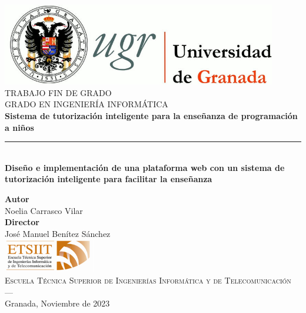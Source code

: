 \begin{titlepage}
 
 
\newlength{\centeroffset}
\setlength{\centeroffset}{-0.5\oddsidemargin}
\addtolength{\centeroffset}{0.5\evensidemargin}
\thispagestyle{empty}

\noindent\hspace*{\centeroffset}\begin{minipage}{\textwidth}

\centering
\includegraphics[width=0.9\textwidth]{imagenes/logo_ugr.jpg}\\[1.4cm]

\textsc{ \Large TRABAJO FIN DE GRADO\\[0.2cm]}
\textsc{GRADO EN INGENIERÍA INFORMÁTICA}\\[1cm]
% 
{\Huge\bfseries  Sistema de tutorización inteligente para la enseñanza de programación a niños\\[0.2cm]}
\noindent\rule[-1ex]{\textwidth}{3pt}\\[3.5ex]
{\large\bfseries Diseño e implementación de una plataforma web con un sistema de tutorización inteligente para facilitar la enseñanza}
\end{minipage}

\vspace{0.5cm}
\noindent\hspace*{\centeroffset}\begin{minipage}{\textwidth}
\centering

\textbf{Autor}\\ {Noelia Carrasco Vilar}\\[1cm]
\textbf{Director}\\ {José Manuel Benítez Sánchez}\\[1cm]
\includegraphics[width=0.3\textwidth]{imagenes/etsiit_logo.png}\\[0.5cm]
\textsc{Escuela Técnica Superior de Ingenierías Informática y de Telecomunicación}\\
\textsc{---}\\
Granada, Noviembre de 2023
\end{minipage}
\end{titlepage}

    
    